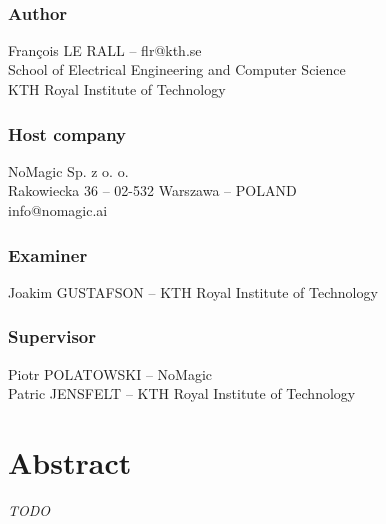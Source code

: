 \documentclass[/home/francois/latex/report/main.tex]{subfiles}
\begin{document}
\newpage
\thispagestyle{plain}

~

\vfill

{ 
	\subsection*{Author}
	François LE RALL – flr@kth.se\\
	School of Electrical Engineering and Computer Science\\
	KTH Royal Institute of Technology

	\subsection*{Host company}
	NoMagic Sp. z o. o.\\
	Rakowiecka 36 – 02-532 Warszawa – POLAND\\
	info@nomagic.ai

	\subsection*{Examiner}
	Joakim GUSTAFSON – KTH Royal Institute of Technology

	\subsection*{Supervisor}
	Piotr POLATOWSKI – NoMagic\\
	Patric JENSFELT – KTH Royal Institute of Technology
	~
}


\newpage
\thispagestyle{plain}
\chapter*{Abstract}

\textit{TODO}

%
%
\end{document}
